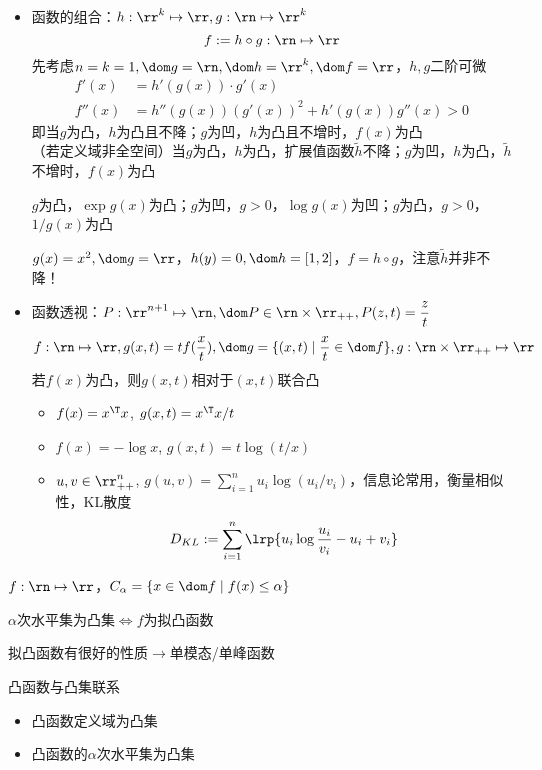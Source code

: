 \begin{itemize}
	\item 函数的组合：$h:\rr^k\mapsto\rr,g:\rn\mapsto\rr^k$
	\[f:=h\circ g:\rn\mapsto\rr\]
	先考虑$n=k=1,\dom g=\rn,\dom h=\rr^k,\dom f=\rr$，$h,g$二阶可微
	\[\begin{aligned}
	f'(x)&=h'(g(x))\cdot g'(x)\\
	f''(x)&=h''(g(x))(g'(x))^2+h'(g(x))g''(x)>0
	\end{aligned}\]
	即当$g$为凸，$h$为凸且不降；$g$为凹，$h$为凸且不增时，$f(x)$为凸\\
	（若定义域非全空间）当$g$为凸，$h$为凸，扩展值函数$\tilde{h}$不降；$g$为凹，$h$为凸，$\tilde{h}$不增时，$f(x)$为凸
	\begin{example}
	$g$为凸，$\exp g(x)$为凸；$g$为凹，$g>0$，$\log g(x)$为凹；$g$为凸，$g>0$，$1/g(x)$为凸
	\end{example}
	\begin{example}
	$g(x)=x^2,\dom g=\rr$，$h(y)=0,\dom h=[1,2]$，$f=h\circ g$，注意$\tilde{h}$并非不降！
	\end{example}
	\item 函数透视：$P:\rr^{n+1}\mapsto\rn,\dom P\in\rn\times\rr_{++},P(z,t)=\dfrac{z}{t}$ %
	\[f:\rn\mapsto\rr,g(x,t)=tf(\frac{x}{t}),\dom g=\{(x,t)\mid\frac{x}{t}\in\dom f\},g:\rn\times\rr_{++}\mapsto\rr\]
	若$f(x)$为凸，则$g(x,t)$相对于$(x,t)$联合凸 %
	\begin{example}
	\begin{itemize}
		\item $f(x)=x^\T x$, $g(x,t)=x^\T x/t$
		\item $f(x)=-\log x$, $g(x,t)=t\log(t/x)$
		\item $u,v\in\rr_{++}^n$, $g(u,v)=\sum_{i=1}^nu_i\log(u_i/v_i)$，信息论常用，衡量相似性，KL散度
		\[D_{KL}:=\sum_{i=1}^n\lrp{u_i\log\frac{u_i}{v_i}-u_i+v_i}\]
	\end{itemize}
	\end{example}
\end{itemize}

\begin{definition}
$f:\rn\mapsto\rr$，$C_\alpha=\{x\in\dom f\mid f(x)\leq\alpha\}$
\end{definition}
\begin{definition}
$\alpha$次水平集为凸集$\iff$$f$为拟凸函数
\end{definition}
拟凸函数有很好的性质$\to$单模态/单峰函数

凸函数与凸集联系
\begin{itemize}
	\item 凸函数定义域为凸集
	\item 凸函数的$\alpha$次水平集为凸集
\end{itemize}